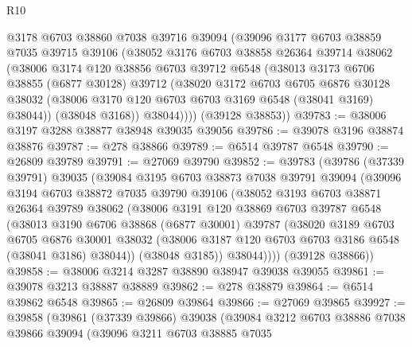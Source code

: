 \begin{lexlean}{R10}
\begin{coremodule}
        @3178
        @6703
        @38860
        @7038
        @39716
        @39094
        (@39096
          @3177
          @6703
          @38859
          @7035
          @39715
          @39106
          (@38052
            @3176
            @6703
            @38858
            @26364
            @39714
            @38062
            (@38006
              @3174
              @120
              @38856
              @6703
              @39712
              @6548
              (@38013
                @3173
                @6706
                @38855
                (@6877 @30128)
                @39712
                (@38020
                  @3172
                  @6703
                  @6705
                  @6876
                  @30128
                  @38032
                  (@38006 @3170 @120 @6703 @6703 @3169 @6548 (@38041 @3169) @38044))
                (@38048 @3168))
              @38044))))
      (@39128 @38853))
@39783 := @38006 @3197 @3288 @38877 @38948 @39035 @39056
@39786 := @39078 @3196 @38874 @38876
@39787 := @278 @38866
@39789 := @6514 @39787 @6548
@39790 := @26809 @39789
@39791 := @27069 @39790
@39852 := @39783
    (@39786
      (@37339 @39791)
      @39035
      (@39084
        @3195
        @6703
        @38873
        @7038
        @39791
        @39094
        (@39096
          @3194
          @6703
          @38872
          @7035
          @39790
          @39106
          (@38052
            @3193
            @6703
            @38871
            @26364
            @39789
            @38062
            (@38006
              @3191
              @120
              @38869
              @6703
              @39787
              @6548
              (@38013
                @3190
                @6706
                @38868
                (@6877 @30001)
                @39787
                (@38020
                  @3189
                  @6703
                  @6705
                  @6876
                  @30001
                  @38032
                  (@38006 @3187 @120 @6703 @6703 @3186 @6548 (@38041 @3186) @38044))
                (@38048 @3185))
              @38044))))
      (@39128 @38866))
@39858 := @38006 @3214 @3287 @38890 @38947 @39038 @39055
@39861 := @39078 @3213 @38887 @38889
@39862 := @278 @38879
@39864 := @6514 @39862 @6548
@39865 := @26809 @39864
@39866 := @27069 @39865
@39927 := @39858
    (@39861
      (@37339 @39866)
      @39038
      (@39084
        @3212
        @6703
        @38886
        @7038
        @39866
        @39094
        (@39096
          @3211
          @6703
          @38885
          @7035

\end{coremodule}
\end{lexlean}
